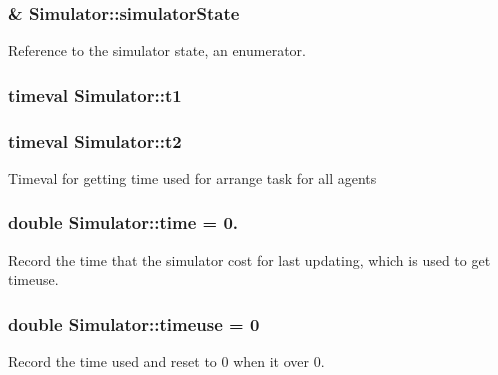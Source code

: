 \subsubsection[{\texorpdfstring{simulator\+State}{simulatorState}}]{\& Simulator\+::simulator\+State\hspace{0.3cm}{\ttfamily [private]}}\hypertarget{classSimulator_adac2342fdb4ea403867b50df76a8d0c7}{}\label{classSimulator_adac2342fdb4ea403867b50df76a8d0c7}
Reference to the simulator state, an enumerator. 
\subsubsection[{\texorpdfstring{t1}{t1}}]{\setlength{\rightskip}{0pt plus 5cm}timeval Simulator\+::t1\hspace{0.3cm}{\ttfamily [private]}}\hypertarget{classSimulator_a6de4772dbd09ae8f0b9f049efada5348}{}\label{classSimulator_a6de4772dbd09ae8f0b9f049efada5348}
\subsubsection[{\texorpdfstring{t2}{t2}}]{\setlength{\rightskip}{0pt plus 5cm}timeval Simulator\+::t2\hspace{0.3cm}{\ttfamily [private]}}\hypertarget{classSimulator_a72a269b612e7c60a7d064718a9f33f79}{}\label{classSimulator_a72a269b612e7c60a7d064718a9f33f79}
Timeval for getting time used for arrange task for all agents 
\subsubsection[{\texorpdfstring{time}{time}}]{\setlength{\rightskip}{0pt plus 5cm}double Simulator\+::time = 0.\hspace{0.3cm}{\ttfamily [static]}}\hypertarget{classSimulator_aa066f39b0352ed03976adf41ff67c1ab}{}\label{classSimulator_aa066f39b0352ed03976adf41ff67c1ab}
Record the time that the simulator cost for last updating, which is used to get timeuse. 
\subsubsection[{\texorpdfstring{timeuse}{timeuse}}]{\setlength{\rightskip}{0pt plus 5cm}double Simulator\+::timeuse = 0\hspace{0.3cm}{\ttfamily [private]}}\hypertarget{classSimulator_ad243edbcd9f9b3a4fa4b6f218444f7ae}{}\label{classSimulator_ad243edbcd9f9b3a4fa4b6f218444f7ae}
Record the time used and reset to 0 when it over 0. 
